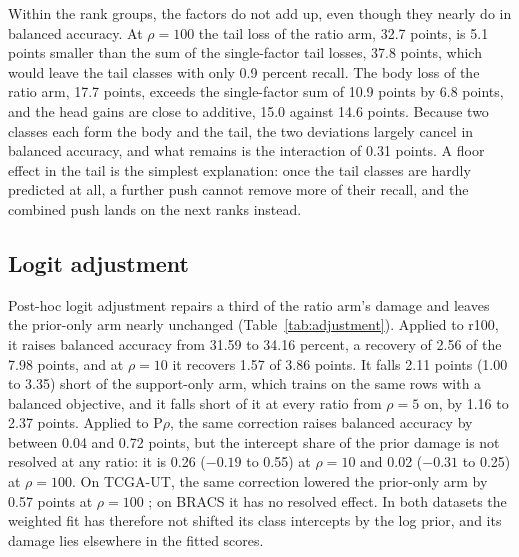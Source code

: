 \noindent Within the rank groups, the factors do not add up, even though they nearly do in balanced accuracy. At $\rho=100$ the tail loss of the ratio arm, 32.7 points, is 5.1 points smaller than the sum of the single-factor tail losses, 37.8 points, which would leave the tail classes with only 0.9 percent recall. The body loss of the ratio arm, 17.7 points, exceeds the single-factor sum of 10.9 points by 6.8 points, and the head gains are close to additive, 15.0 against 14.6 points. Because two classes each form the body and the tail, the two deviations largely cancel in balanced accuracy, and what remains is the interaction of 0.31 points. A floor effect in the tail is the simplest explanation: once the tail classes are hardly predicted at all, a further push cannot remove more of their recall, and the combined push lands on the next ranks instead.

\subsection{Logit adjustment}
\label{sec:adjustment-results}
Post-hoc logit adjustment repairs a third of the ratio arm's damage and leaves the prior-only arm nearly unchanged (Table~\ref{tab:adjustment}). Applied to r100, it raises balanced accuracy from 31.59 to 34.16 percent, a recovery of 2.56 of the 7.98 points, and at $\rho=10$ it recovers 1.57 of 3.86 points. It falls 2.11 points (1.00 to 3.35) short of the support-only arm, which trains on the same rows with a balanced objective, and it falls short of it at every ratio from $\rho=5$ on, by 1.16 to 2.37 points. Applied to P$\rho$, the same correction raises balanced accuracy by between 0.04 and 0.72 points, but the intercept share of the prior damage is not resolved at any ratio: it is 0.26 ($-0.19$ to 0.55) at $\rho=10$ and 0.02 ($-0.31$ to 0.25) at $\rho=100$. On TCGA-UT, the same correction lowered the prior-only arm by 0.57 points at $\rho=100$ \citep{queisler2026causeTcga}; on BRACS it has no resolved effect. In both datasets the weighted fit has therefore not shifted its class intercepts by the log prior, and its damage lies elsewhere in the fitted scores.

